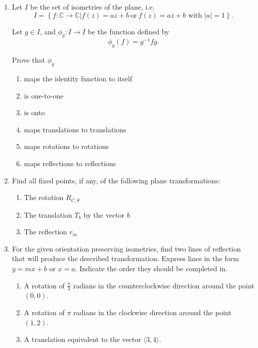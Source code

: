 \documentclass[
]{book}
\providecommand{\tightlist}{%
  \setlength{\itemsep}{0pt}\setlength{\parskip}{0pt}}
\theoremstyle{definition}
\theoremstyle{definition}
\theoremstyle{definition}
\theoremstyle{definition}
\theoremstyle{remark}
\begin{document}
\begin{enumerate}
\def\labelenumi{\arabic{enumi}.}
\item
  Let \(I\) be the set of isometries of the plane, i.e.~\[I= \left\{ f:\mathbb{C} \rightarrow \mathbb{C} | f(z)=az+b \: \mbox{or} \: f(z)=a\overline{z}+b \mbox{ with }  |a|=1 \right\}.\]

  Let \(g\in I\), and \(\phi_g : I \rightarrow I\) be the function defined by \[\phi_g (f) = g^{-1} f g.\]

  Prove that \(\phi_g\)

  \begin{enumerate}
  \def\labelenumii{\alph{enumii}.}
  \tightlist
  \item
    maps the identity function to itself
  \item
    is one-to-one
  \item
    is onto
  \item
    maps translations to translations
  \item
    maps rotations to rotations
  \item
    maps reflections to reflections
  \end{enumerate}
\item
  Find all fixed points, if any, of the following plane transformations:

  \begin{enumerate}
  \def\labelenumii{\alph{enumii}.}
  \tightlist
  \item
    The rotation \(R_{C,\theta}\)
  \item
    The translation \(T_b\) by the vector \(b\)
  \item
    The reflection \(r_m\)
  \end{enumerate}
\item
  For the given orientation preserving isometries, find two lines of reflection that will produce the described transformation. Express lines in the form \(y=mx+b\) or \(x=a\). Indicate the order they should be completed in.

  \begin{enumerate}
  \def\labelenumii{\alph{enumii}.}
  \tightlist
  \item
    A rotation of \(\frac{\pi}{3}\) radians in the counterclockwise direction around the point \((0,0)\).
  \item
    A rotation of \(\pi\) radians in the clockwise direction around the point \((1,2)\).
  \item
    A translation equivalent to the vector \(\langle 3,4\rangle\).
  \end{enumerate}
\end{enumerate}
\end{document}
